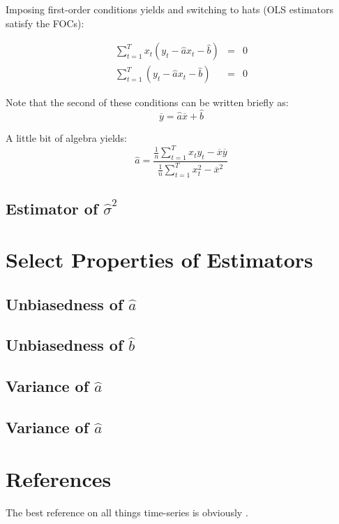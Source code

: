 \documentclass[12pt]{article}
\begin{document}
Imposing first-order conditions yields and switching to hats (OLS estimators satisfy the FOCs):

\begin{eqnarray}
\sum_{t=1}^{T}x_t (y_t - \hat{a} x_t - \hat{b}) &=&  0 \\
\sum_{t=1}^{T} (y_t - \hat{a} x_t - \hat{b}) &=& 0
\end{eqnarray}

Note that the second of these conditions can be written briefly as:
\begin{equation}
\overline{y} = \hat{a} \overline{x} + \hat{b}
\end{equation}

A little bit of algebra yields:
\begin{equation}
\hat{a} = \frac{\frac{1}{n}\sum_{t=1}^{T}x_t y_t - \overline{x} \overline{y}}
{\frac{1}{n}\sum_{t=1}^{T}x_t^2 - \overline{x}^2}
\end{equation}

\subsection{Estimator of $\hat{\sigma}^2$}


\section{Select Properties of Estimators}

\subsection{Unbiasedness of $\hat{a}$}

\subsection{Unbiasedness of $\hat{b}$}

\subsection{Variance of $\hat{a}$}
\subsection{Variance of $\hat{a}$}


\section{References}
The best reference on all things time-series is obviously \cite{hamilton_tsa}. 




\end{document}
